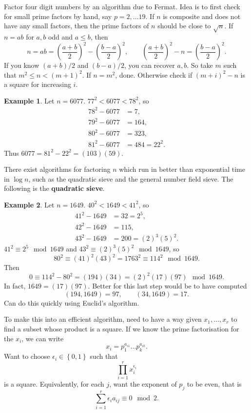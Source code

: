 \documentclass{article}
\newcommand{\rb}[1]{\left( #1 \right)}
\newcommand{\cb}[1]{\left\{ #1 \right\}}
\theoremstyle{definition}\newtheorem{definition}{Definition}
\theoremstyle{definition}\newtheorem{remark}[definition]{Remark}
\theoremstyle{definition}\newtheorem*{example}{Example}
\theoremstyle{definition}\newtheorem*{note}{Note}
\begin{document}
Factor four digit numbers by an algorithm due to Fermat. Idea is to first check for small prime factors by hand, say $ p = 2, \dots 19 $. If $ n $ is composite and does not have any small factors, then the prime factors of $ n $ should be close to $ \sqrt{n} $. If $ n = ab $ for $ a, b $ odd and $ a \le b $, then
$$ n = ab = \rb{\dfrac{a + b}{2}}^2 - \rb{\dfrac{b - a}{2}}^2, \qquad \rb{\dfrac{a + b}{2}}^2 - n = \rb{\dfrac{b - a}{2}}^2. $$
If you know $ \rb{a + b} / 2 $ and $ \rb{b - a} / 2 $, you can recover $ a, b $. So take $ m $ such that $ m^2 \le n < \rb{m + 1}^2 $. If $ n = m^2 $, done. Otherwise check if $ \rb{m + i}^2 - n $ is a square for increasing $ i $.

\begin{example}
Let $ n  = 6077 $. $ 77^2 < 6077 < 78^2 $, so
\begin{align*}
78^2 - 6077 & = 7, \\
79^2 - 6077 & = 164, \\
80^2 - 6077 & = 323, \\
81^2 - 6077 & = 484 = 22^2.
\end{align*}
Thus $ 6077 = 81^2 - 22^2 = \rb{103}\rb{59} $.
\end{example}

There exist algorithms for factoring $ n $ which run in better than exponential time in $ \log n $, such as the quadratic sieve and the general number field sieve. The following is the \textbf{quadratic sieve}.

\begin{example}
Let $ n = 1649 $. $ 40^2 < 1649 < 41^2 $, so
\begin{align*}
41^2 - 1649 & = 32 = 2^5, \\
42^2 - 1649 & = 115, \\
43^2 - 1649 & = 200 = \rb{2}^3\rb{5}^2.
\end{align*}
$ 41^2 \equiv 2^5 \mod 1649 $ and $ 43^2 \equiv \rb{2}^3\rb{5}^2 \mod 1649 $, so
$$ 80^2 \equiv \rb{41}^2\rb{43}^2 = 1763^2 \equiv 114^2 \mod 1649. $$
Then
$$ 0 \equiv 114^2 - 80^2 = \rb{194}\rb{34} = \rb{2}^2\rb{17}\rb{97} \mod 1649. $$
In fact, $ 1649 = \rb{17}\rb{97} $. Better for this last step would be to have computed
$$ \rb{194, 1649} = 97, \qquad \rb{34, 1649} = 17. $$
Can do this quickly using Euclid's algorithm.
\end{example}

To make this into an efficient algorithm, need to have a way given $ x_1, \dots, x_r $ to find a subset whose product is a square. If we know the prime factorisation for the $ x_i $, we can write
$$ x_i = p_1^{a_{i1}} \dots p_k^{a_{ik}}. $$
Want to choose $ \epsilon_i \in \cb{0, 1} $ such that
$$ \prod_{i = 1}^r x_i^{\epsilon_i} $$
is a square. Equivalently, for each $ j $, want the exponent of $ p_j $ to be even, that is
$$ \sum_{i = 1}^r \epsilon_ia_{ij} \equiv 0 \mod 2. $$
\end{document}
